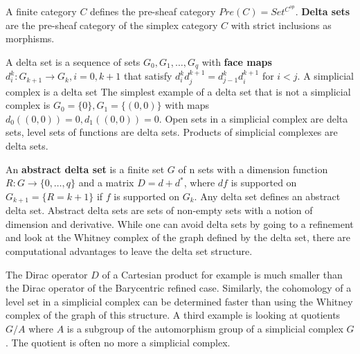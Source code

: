 \documentclass[12pt]{amsart}
\begin{document}
\vspace{3mm}
A finite category $C$ defines the pre-sheaf category $Pre(C)=Set^{C^{op}}$.
{\bf Delta sets} are the pre-sheaf category of the simplex category $C$ with strict
inclusions as morphisms.

\vspace{3mm}
A delta set is a sequence of sets $G_0,G_1, \dots, G_q$ with {\bf face maps} $d_i^k: G_{k+1} \to G_k, i=0, k+1$
that satisfy $d_i^k d_j^{k+1}=d_{j-1}^k d_i^{k+1}$ for $i<j$. A simplicial complex is a delta set
The simplest example of a delta set that is not a simplicial complex is $G_0=\{0\},G_1=\{ (0,0) \}$
with maps $d_0( (0,0) ) = 0, d_1( (0,0) ) = 0$. Open sets in a simplicial complex are delta sets,
level sets of functions are delta sets. Products of simplicial complexes are delta sets.

\vspace{3mm}
An {\bf abstract delta set} is a finite set $G$ of n sets with a dimension function $R:G \to \{0,\dots, q\}$
and a matrix $D=d+d^*$, where $df$ is supported on $G_{k+1}=\{ R=k+1 \}$ if $f$ is supported on $G_k$.
Any delta set defines an abstract delta set. Abstract delta sets are sets of non-empty sets
with a notion of dimension and derivative. While one can avoid delta sets by going to a refinement and 
look at the Whitney complex of the graph defined by the delta set, there are computational advantages
to leave the delta set structure. 

\vspace{3mm}
The Dirac operator $D$ of a Cartesian product for example is 
much smaller than the Dirac operator of the Barycentric refined case. Similarly, the cohomology of a
level set in a simplicial complex can be determined faster than using the Whitney complex of the graph 
of this structure. A third example is looking at quotients $G/A$ where $A$ is a subgroup of the automorphism
group of a simplicial complex $G$. The quotient is often no more a simplicial complex.

 \vfill \pagebreak

\printindex
\end{document}
